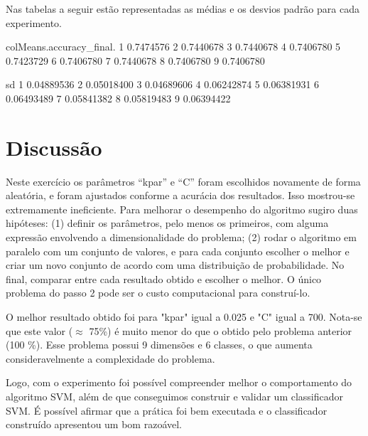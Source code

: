 \documentclass[12pt]{article}
\begin{document}
  \par Nas tabelas a seguir estão representadas as médias e os desvios padrão para cada experimento.
\begin{Schunk}
\begin{Soutput}
  colMeans.accuracy_final.
1                0.7474576
2                0.7440678
3                0.7440678
4                0.7406780
5                0.7423729
6                0.7406780
7                0.7440678
8                0.7406780
9                0.7406780
\end{Soutput}
\begin{Soutput}
          sd
1 0.04889536
2 0.05018400
3 0.04689606
4 0.06242874
5 0.06381931
6 0.06493489
7 0.05841382
8 0.05819483
9 0.06394422
\end{Soutput}
\end{Schunk}


\section{Discussão}

  \par Neste exercício os parâmetros “kpar” e “C” foram escolhidos novamente de forma aleatória, e foram ajustados conforme a acurácia dos resultados. Isso mostrou-se extremamente ineficiente. Para melhorar o desempenho do algoritmo sugiro duas hipóteses: (1) definir os parâmetros, pelo menos os primeiros, com alguma expressão envolvendo a dimensionalidade do problema; (2) rodar o algoritmo em paralelo com um conjunto de valores, e para cada conjunto escolher o melhor e criar um novo conjunto de acordo com uma distribuição de probabilidade. No final, comparar entre cada resultado obtido e escolher o melhor. O único problema do passo 2 pode ser o custo computacional para construí-lo.
  
   \par O melhor resultado obtido foi para "kpar" igual a 0.025 e "C" igual a 700. Nota-se que este valor ($\approx$ 75\%) é muito menor do que o obtido pelo problema anterior (100 \%). Esse problema possui 9 dimensões e 6 classes, o que aumenta consideravelmente a complexidade do problema.
  
  \par Logo, com o experimento foi possível compreender melhor o comportamento do algoritmo SVM, além de que conseguimos construir e validar um classificador SVM. É possível afirmar que a prática foi bem executada e o classificador construído apresentou um bom razoável. 

\end{document}
